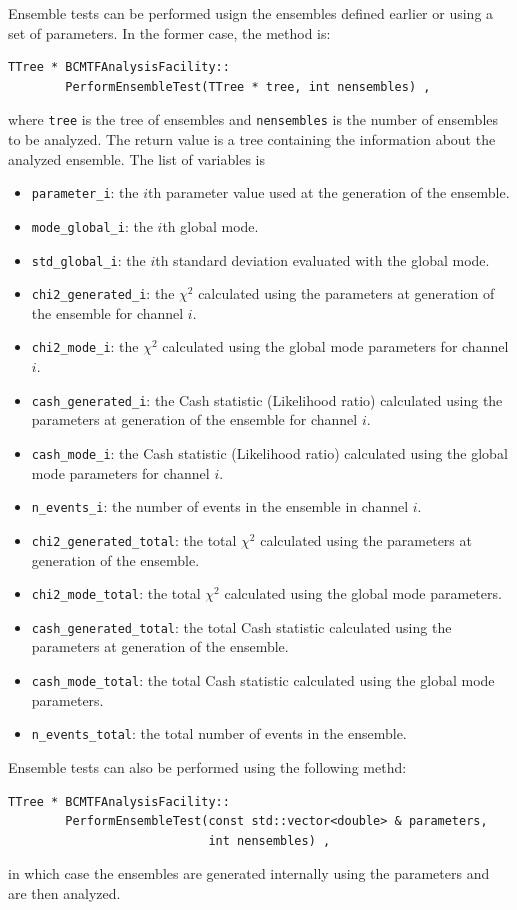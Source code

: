 \documentclass[11pt, a4paper]{article}
\begin{document}
Ensemble tests can be performed usign the ensembles defined earlier or
using a set of parameters. In the former case, the method is:
%
\begin{verbatim}
TTree * BCMTFAnalysisFacility::
        PerformEnsembleTest(TTree * tree, int nensembles) ,
\end{verbatim}
%
where \verb|tree| is the tree of ensembles and \verb|nensembles| is
the number of ensembles to be analyzed. The return value is a tree
containing the information about the analyzed ensemble. The list of
variables is
%
\begin{itemize}
\item \verb|parameter_i|: the $i$th parameter value used at the
  generation of the ensemble.
\item \verb|mode_global_i|: the $i$th global mode.
\item \verb|std_global_i|: the $i$th standard deviation evaluated with
  the global mode.
\item \verb|chi2_generated_i|: the $\chi^{2}$ calculated using the
  parameters at generation of the ensemble for channel $i$.
\item \verb|chi2_mode_i|: the $\chi^{2}$ calculated using the
  global mode parameters for channel $i$.
\item \verb|cash_generated_i|: the Cash statistic (Likelihood ratio)
  calculated using the parameters at generation of the ensemble for
  channel $i$.
\item \verb|cash_mode_i|: the Cash statistic (Likelihood ratio)
  calculated using the global mode parameters for channel $i$.
\item \verb|n_events_i|: the number of events in the ensemble in
  channel $i$.
\item \verb|chi2_generated_total|: the total $\chi^{2}$ calculated
  using the parameters at generation of the ensemble.
\item \verb|chi2_mode_total|: the total $\chi^{2}$ calculated using
  the global mode parameters.
\item \verb|cash_generated_total|: the total Cash statistic calculated
  using the parameters at generation of the ensemble.
\item \verb|cash_mode_total|: the total Cash statistic calculated
  using the global mode parameters.
\item \verb|n_events_total|: the total number of events in the
  ensemble.
\end{itemize}

Ensemble tests can also be performed using the following methd:
%
\begin{verbatim}
TTree * BCMTFAnalysisFacility::
        PerformEnsembleTest(const std::vector<double> & parameters,
                            int nensembles) ,
\end{verbatim}
%
in which case the ensembles are generated internally using the
parameters and are then analyzed.
\end{document}
